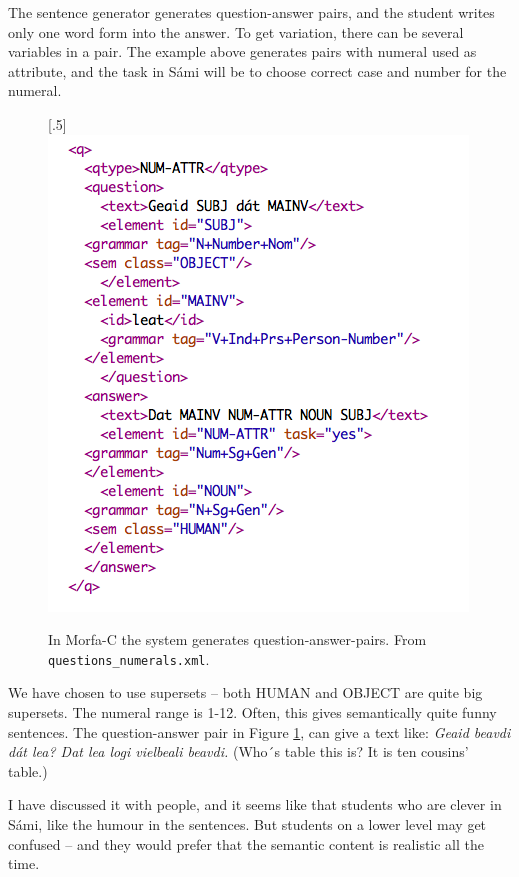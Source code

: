 \documentclass[a4paper,12pt]{article}
\begin{document}
\vspace{0.5cm}

The sentence generator generates question-answer pairs, and the student writes only one word form into the answer. To get variation, there can be several variables in a pair. The example above generates pairs with numeral used as attribute, and the task in Sámi will be to choose correct case and number for the numeral. \\  


\begin{figure}[htbp]
\begin{center}
\scalebox{.5}[.5]{\includegraphics{presentation/img/morfa_question.png}}\\
\caption{In Morfa-C the system generates question-answer-pairs. From \texttt{questions\_numerals.xml}.}
\label{questionm}
\end{center}
\end{figure}


We have chosen to use supersets -- both HUMAN and OBJECT are quite big supersets. The numeral range is 1-12. Often, this gives semantically quite funny sentences. The question-answer pair in Figure \ref{questionm}, can give a text like: \textit{Geaid beavdi dát lea? Dat lea logi vielbeali beavdi.} (Who´s table this is? It is ten cousins’ table.) 

I have discussed it with people, and it seems like that students who are clever in Sámi, like the humour in the sentences. But students on a lower level may get confused -- and they would prefer that the semantic content is realistic all the time.   
\end{document}
